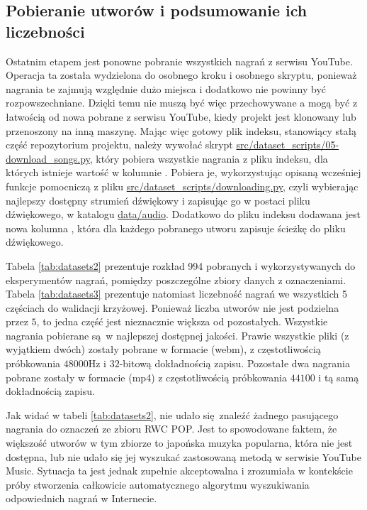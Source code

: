 \subsection{Pobieranie utworów i podsumowanie ich liczebności}

Ostatnim etapem jest ponowne pobranie wszystkich nagrań z serwisu YouTube. Operacja ta została
wydzielona do osobnego kroku i osobnego skryptu, ponieważ nagrania te zajmują względnie dużo miejsca
i dodatkowo nie powinny być rozpowszechniane. Dzięki temu nie muszą być więc przechowywane a mogą
być z łatwością od nowa pobrane z serwisu YouTube, kiedy projekt jest klonowany lub przenoszony na
inną maszynę. Mając więc gotowy plik indeksu, stanowiący stałą część repozytorium projektu, należy
wywołać skrypt \url{src/dataset_scripts/05-download_songs.py}, który pobiera wszystkie nagrania z
pliku indeksu, dla których istnieje wartość w kolumnie . Pobiera je, wykorzystując
opisaną wcześniej funkcje pomocniczą z pliku \url{src/dataset_scripts/downloading.py}, czyli
wybierając najlepszy dostępny strumień dźwiękowy i zapisując go w postaci pliku dźwiękowego, w
katalogu \url{data/audio}. Dodatkowo do pliku indeksu dodawana jest nowa kolumna
, która dla każdego pobranego utworu zapisuje ścieżkę do pliku dźwiękowego.

Tabela \ref{tab:datasets2} prezentuje rozkład 994 pobranych i wykorzystywanych do eksperymentów
nagrań, pomiędzy poszczególne zbiory danych z oznaczeniami. Tabela \ref{tab:datasets3} prezentuje
natomiast liczebność nagrań we wszystkich 5 częściach do walidacji krzyżowej. Ponieważ liczba
utworów nie jest podzielna przez $5$, to jedna część jest nieznacznie większa od pozostałych.
Wszystkie nagrania pobierane są w najlepszej dostępnej jakości. Prawie wszystkie pliki (z wyjątkiem
dwóch) zostały pobrane w formacie \filetype(webm), z częstotliwością próbkowania $48000$Hz i
$32$-bitową dokładnością zapisu.  Pozostałe dwa nagrania pobrane zostały w formacie \filetype(mp4) z
częstotliwością próbkowania $44100$ i tą samą dokładnością zapisu.

Jak widać w tabeli \ref{tab:datasets2}, nie udało się znaleźć żadnego pasującego nagrania do
oznaczeń ze zbioru RWC POP. Jest to spowodowane faktem, że większość utworów w tym zbiorze to
japońska muzyka popularna, która nie jest dostępna, lub nie udało się jej wyszukać zastosowaną
metodą w serwisie YouTube Music. Sytuacja ta jest jednak zupełnie akceptowalna i zrozumiała w
kontekście próby stworzenia całkowicie automatycznego algorytmu wyszukiwania odpowiednich nagrań w
Internecie.

